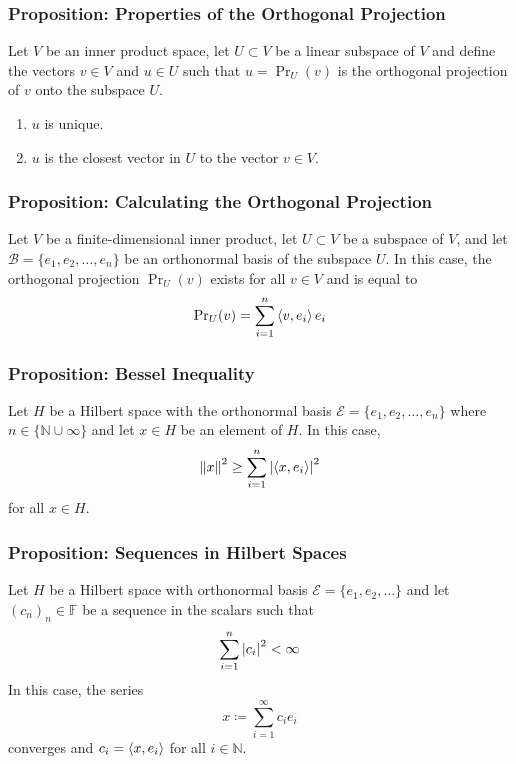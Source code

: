\documentclass[11pt, a4paper]{article}
\newcommand{\F}{\mathbb{F}} %
\begin{document}
\subsubsection{Proposition: Properties of the Orthogonal Projection}
Let $ V $ be an inner product space, let $ U \subset V $ be a linear subspace of $ V $ and define the vectors $ v \in V$ and $ u \in U $ such that $ u = \operatorname{Pr}_{U}(v) $ is the orthogonal projection of $ v $ onto the subspace $ U $.

\begin{enumerate}
	\item $ u $ is unique.
	\item $ u $ is the closest vector in $ U $ to the vector $ v \in V$.
\end{enumerate}

\subsubsection{Proposition: Calculating the Orthogonal Projection}
Let $ V $ be a finite-dimensional inner product, let $ U \subset V $ be a subspace of $ V $, and let $ \mathcal{B} = \{e_1, e_2, \dots, e_n \} $ be an orthonormal basis of the subspace $ U $. In this case, the orthogonal projection $  \operatorname{Pr}_{U}(v) $ exists for all $ v \in V $ and is equal to
\begin{equation*}
	 \operatorname{Pr}_{U}(v) = \sum_{i = 1}^{n} \expval{v, e_i} e_i
\end{equation*}

\subsubsection{Proposition: Bessel Inequality}
Let $ H $ be a Hilbert space with the orthonormal basis $ \mathcal{E} = \{e_1, e_2, \dots, e_n \} $ where $ n \in \{\mathbb{N} \cup \infty \} $ and let $ x \in H $ be an element of $ H $. In this case,
\begin{equation*}
	\norm{x}^2 \geq \sum_{i=1}^{n} \abs{\expval{x, e_i}}^2 
\end{equation*}
for all $ x \in H $.

\subsubsection{Proposition: Sequences in Hilbert Spaces}
Let $ H $ be a Hilbert space with orthonormal basis $ \mathcal{E} = \{e_1, e_2, \dots \} $ and let $ (c_n)_n \in \F $ be a sequence in the scalars such that
\begin{equation*}
	\sum_{i = 1}^{n}\abs{c_i}^2 < \infty
\end{equation*}
In this case, the series 
\begin{equation*}
	x \coloneqq \sum_{i=1}^{\infty}c_i e_i
\end{equation*}
converges and $ c_i = \expval{x, e_i} $ for all $ i \in \mathbb{N} $.
\end{document}
